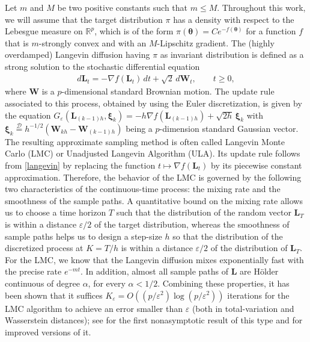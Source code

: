 \documentclass[a4paper,bej,preprint,reqno]{imsart}
\newcommand\bL{\boldsymbol L}
\newcommand\bW{\boldsymbol W}
\newcommand\bxi{\boldsymbol \xi}
\newcommand\RR{\mathbb R}
\newcommand\btheta{\boldsymbol\theta}
\begin{document}
Let $m$ and $M$ be two positive constants such that $m\le M$. Throughout this work, we will assume that the target distribution $\pi$ has a density with respect to the Lebesgue measure on $\RR^p$, which is of the form $\pi(\btheta) = C e^{-f(\btheta)}$ for a
function $f$ that
is $m$-strongly convex and with an $M$-Lipschitz gradient. The (highly overdamped) Langevin diffusion having $\pi$ as invariant distribution is defined as a strong solution to the stochastic differential equation
\begin{align}
    d\bL_t = -\nabla f(\bL_t)\,dt + \sqrt{2}\,d\bW_t,\qquad t\ge 0,
    \label{langevin}
\end{align}
where $\bW$ is a $p$-dimensional standard Brownian motion. The update rule associated
to this process, obtained by using the Euler discretization, is given by the
equation
$G_\varepsilon(\bL_{(k-1)h},\bxi_k) = -h \nabla f(\bL_{(k-1)h}) + \sqrt{2h}\, \bxi_{k}$
with $\bxi_k \stackrel{\mathscr D}{=} h^{-1/2}(\bW_{kh}-\bW_{(k-1)h})$ being
a $p$-dimension standard Gaussian vector. The resulting approximate sampling
method is often called Langevin Monte Carlo (LMC) or Unadjusted Langevin Algorithm (ULA).
Its update rule follows from \eqref{langevin}
by replacing the function $t\mapsto \nabla f(\bL_t)$ by its piecewise constant
approximation. Therefore, the behavior of the LMC is governed by the following two
characteristics of the continuous-time process: the mixing rate and the smoothness
of the sample paths. A quantitative bound on the mixing rate allows us to choose a
time horizon $T$ such that the distribution of the random vector $\bL_T$ is within
a distance $\varepsilon/2$ of the target distribution, whereas the smoothness of sample
paths helps us to design a step-size $h$ so that the distribution of the discretized
process at $K=T/h$ is within a distance $\varepsilon/2$ of the distribution of $\bL_T$.
For the LMC, we know that the Langevin diffusion mixes exponentially fast with the
precise rate $e^{-mt}$. In addition, almost all sample paths of $\bL$ are H\"older
continuous of degree $\alpha$, for every $\alpha<1/2$. Combining these properties,
it has been shown that it suffices $K_\varepsilon = O((p/\varepsilon^2)\log(p/\varepsilon^2))$
iterations for the LMC algorithm to achieve an error smaller than $\varepsilon$
(both in total-variation and Wasserstein distances); see \citep{Dal14} for the first nonasymptotic result of this type and \citep{Durmus2,durmus2017,DalKar17} for improved versions of it.
\end{document}

